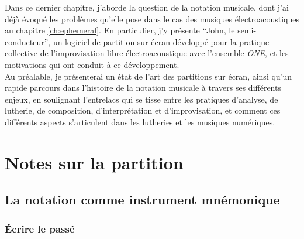 \noindent Dans ce dernier chapitre, j'aborde la question de la notation musicale, dont j'ai déjà évoqué les problèmes qu'elle pose dans le cas des musiques électroacoustiques au chapitre \ref{ch:ephemeral}. En particulier, j'y présente ``John, le semi-conducteur'', un logiciel de partition sur écran développé pour la pratique collective de l'improvisation libre électroacoustique avec l'ensemble \textit{ONE}, et les motivations qui ont conduit à ce développement.\\
\indent Au préalable, je présenterai un état de l'art des partitions sur écran, ainsi qu'un rapide parcours dans l'histoire de la notation musicale à travers ses différents enjeux, en soulignant l'entrelacs qui se tisse entre les pratiques d'analyse, de lutherie, de composition, d'interprétation et d'improvisation, et comment ces différents aspects s'articulent dans les lutheries et les musiques numériques.

\clearpage

\section{Notes sur la partition}

\subsection{La notation comme instrument mnémonique}

\subsubsection{Écrire le passé}

